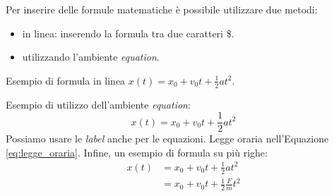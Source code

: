 Per inserire delle formule matematiche è possibile utilizzare due metodi:
\begin{itemize}
\item in linea: inserendo la formula tra due caratteri \$. 
\item utilizzando l'ambiente \textit{equation}.
\end{itemize}

\noindent Esempio di formula in linea $x(t)=x_{0} + v_{0}t + \frac{1}{2}at^{2}$.

\noindent Esempio di utilizzo dell'ambiente \textit{equation}:
\begin{equation}\label{eq:legge_oraria}
x(t)=x_{0} + v_{0}t + \frac{1}{2}at^{2}
\end{equation}
Possiamo usare le \textit{label} anche per le equazioni. Legge oraria nell'Equazione \ref{eq:legge_oraria}.
Infine, un esempio di formula su più righe:
\begin{equation}
\begin{split}
x(t) &= x_{0} + v_{0}t + \frac{1}{2}at^{2} \\ & =
		x_{0} + v_{0}t + \frac{1}{2}\frac{F}{m}t^{2}
\end{split}
\end{equation}